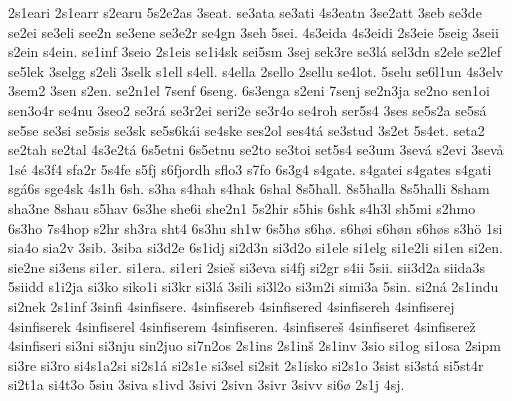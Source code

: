 {    2s1eari
    2s1earr
    s2earu
    5s2e2as
    3seat.
    se3ata
    se3ati
    4s3eatn
    3se2att
    3seb
    se3de
    se2ei
    se3eli
    see2n
    se3ene
    se3e2r
    se4gn
    3seh
    5sei.
    4s3eida
    4s3eidi
    2s3eie
    5seig
    3seii
    s2ein
    s4ein.
    se1inf
    3seio
    2s1eis
    se1i4sk
    sei5sm
    3sej
    sek3re
    se3lá
    sel3dn
    s2ele
    se2lef
    se5lek
    3selgg
    s2eli
    3selk
    s1ell
    s4ell.
    s4ella
    2sello
    2sellu
    se4lot.
    5selu
    se6l1un
    4s3elv
    3sem2
    3sen
    s2en.
    se2n1el
    7senf
    6seng.
    6s3enga
    s2eni
    7senj
    se2n3ja
    se2no
    sen1oi
    sen3o4r
    se4nu
    3seo2
    se3rá
    se3r2ei
    seri2e
    se3r4o
    se4roh
    ser5s4
    3ses
    se5s2a
    se5sá
    se5se
    se3si
    se5sis
    se3sk
    se5s6kái
    se4ske
    ses2ol
    ses4tá
    se3stud
    3s2et
    5s4et.
    seta2
    se2tah
    se2tal
    4s3e2tá
    6s5etni
    6s5etnu
    se2to
    se3toi
    set5s4
    se3um
    3sevá
    s2evi
    3sevå
    1sé
    4s3f4
    sfa2r
    5s4fe
    s5fj
    s6fjordh
    sflo3
    s7fo
    6s3g4
    s4gate.
    s4gatei
    s4gates
    s4gati
    sgá6s
    sge4sk
    4s1h
    6sh.
    s3ha
    s4hah
    s4hak
    6shal
    8s5hall.
    8s5halla
    8s5halli
    8sham
    sha3ne
    8shau
    s5hav
    6s3he
    she6i
    she2n1
    5s2hir
    s5his
    6shk
    s4h3l
    sh5mi
    s2hmo
    6s3ho
    7s4hop
    s2hr
    sh3ra
    sht4
    6s3hu
    sh1w
    6s5hø
    s6hø.
    s6høi
    s6høn
    s6høs
    s3hö
    1si
    sia4o
    sia2v
    3sib.
    3siba
    si3d2e
    6s1idj
    si2d3n
    si3d2o
    si1ele
    si1elg
    si1e2li
    si1en
    si2en.
    sie2ne
    si3ens
    si1er.
    si1era.
    si1eri
    2sieš
    si3eva
    si4fj
    si2gr
    s4ii
    5sii.
    sii3d2a
    siida3s
    5siidd
    s1i2ja
    si3ko
    siko1i
    si3kr
    si3lá
    3sili
    si3l2o
    si3m2i
    simi3a
    5sin.
    si2ná
    2s1indu
    si2nek
    2s1inf
    3sinfi
    4sinfisere.
    4sinfisereb
    4sinfisered
    4sinfisereh
    4sinfiserej
    4sinfiserek
    4sinfiserel
    4sinfiserem
    4sinfiseren.
    4sinfisereš
    4sinfiseret
    4sinfiserež
    4sinfiseri
    si3ni
    si3nju
    sin2juo
    si7n2os
    2s1ins
    2s1inš
    2s1inv
    3sio
    si1og
    si1osa
    2sipm
    si3re
    si3ro
    si4s1a2si
    si2s1á
    si2s1e
    si3sel
    si2sit
    2s1isko
    si2s1o
    3sist
    si3stá
    si5st4r
    si2t1a
    si4t3o
    5siu
    3siva
    s1ivd
    3sivi
    2sivn
    3sivr
    3sivv
    si6ø
    2s1j
    4sj.
}
